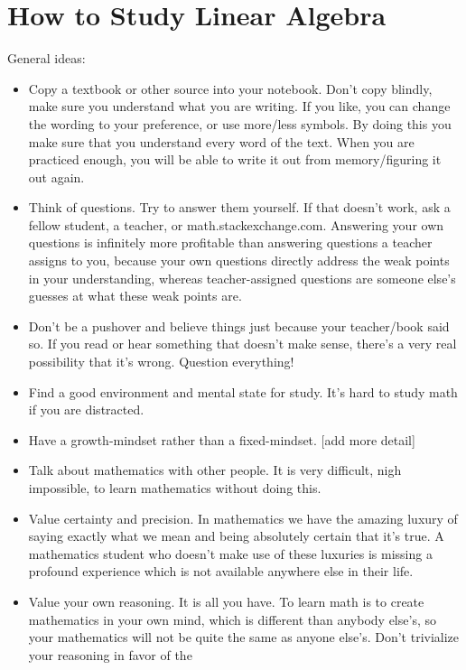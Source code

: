 \documentclass[12pt]{article}
\newcounter{exc}
\begin{document}
\section{How to Study Linear Algebra}

General ideas:
\begin{itemize}
  \item Copy a textbook or other source into your notebook.  Don't
    copy blindly, make sure you understand what you are writing.  If
    you like, you can change the wording to your preference, or use
    more/less symbols.  By doing this you make sure that you
    understand every word of the text. When you are practiced enough,
    you will be able to write it out from memory/figuring it out
    again. 
  \item Think of questions.  Try to answer them yourself.  If that
    doesn't work, ask a fellow student, a teacher, or
    math.stackexchange.com.  Answering your own questions is
    infinitely more profitable than answering questions a teacher
    assigns to you, because your own questions directly address the
    weak points in your understanding, whereas teacher-assigned
    questions are someone else's guesses at what these weak points
    are.  
  \item Don't be a pushover and believe things just because your
    teacher/book said so.  If you read or hear something that doesn't
    make sense, there's a very real possibility that it's wrong.
    Question everything!
  \item Find a good environment and mental state for study.  It's hard
    to study math if you are distracted. 
  \item Have a growth-mindset rather than a fixed-mindset.  [add more detail]
  \item Talk about mathematics with other people.  It is very
    difficult, nigh impossible, to learn mathematics without doing
    this. 
  \item Value certainty and precision.  In mathematics we have the
    amazing luxury of saying exactly what we mean and being absolutely
    certain that it's true.  A mathematics student who doesn't make
    use of these luxuries is missing a profound experience which is
    not available anywhere else in their life.  
  \item Value your own reasoning.  It is all you have.  To learn math
    is to create mathematics in your own mind, which is different than
    anybody else's, so your mathematics will not be quite the same as
    anyone else's.  Don't trivialize your reasoning in favor of the

\end{itemize}
\end{document}
